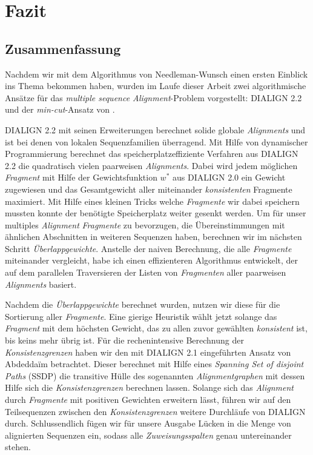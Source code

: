 \chapter{Fazit}
\label{ch:fazit}

\section{Zusammenfassung}

Nachdem wir mit dem Algorithmus von Needleman-Wunsch einen ersten Einblick ins Thema bekommen haben, wurden im Laufe dieser Arbeit zwei algorithmische Ansätze für das \emph{multiple sequence Alignment}-Problem vorgestellt: DIALIGN 2.2 und der \emph{min-cut}-Ansatz von \cite{cpm10}.

DIALIGN 2.2 mit seinen Erweiterungen berechnet solide globale \emph{Alignments} und ist bei denen von lokalen Sequenzfamilien überragend. Mit Hilfe von dynamischer Programmierung berechnet das speicherplatzeffiziente Verfahren aus DIALIGN 2.2 die quadratisch vielen paarweisen \emph{Alignments}. Dabei wird jedem möglichen \emph{Fragment} mit Hilfe der Gewichtsfunktion $w^{*}$ aus DIALIGN 2.0 ein Gewicht zugewiesen und das Gesamtgewicht aller miteinander \emph{konsistenten} Fragmente maximiert. Mit Hilfe eines kleinen Tricks welche \emph{Fragmente} wir dabei speichern mussten konnte der benötigte Speicherplatz weiter gesenkt werden. Um für unser multiples \emph{Alignment} \emph{Fragmente} zu bevorzugen, die Übereinstimmungen mit ähnlichen Abschnitten in weiteren Sequenzen haben, berechnen wir im nächsten Schritt \emph{Überlappgewichte}. Anstelle der naiven Berechnung, die alle \emph{Fragmente} miteinander vergleicht, habe ich einen effizienteren Algorithmus entwickelt, der auf dem parallelen Traversieren der Listen von \emph{Fragmenten} aller paarweisen \emph{Alignments} basiert.

Nachdem die \emph{Überlappgewichte} berechnet wurden, nutzen wir diese für die Sortierung aller \emph{Fragmente}. Eine gierige Heuristik wählt jetzt solange das \emph{Fragment} mit dem höchsten Gewicht, das zu allen zuvor gewählten \emph{konsistent} ist, bis keins mehr übrig ist. Für die rechenintensive Berechnung der \emph{Konsistenzgrenzen} haben wir den mit DIALIGN 2.1 eingeführten Ansatz von Abdedda\"im betrachtet. Dieser berechnet mit Hilfe eines \emph{Spanning Set of disjoint Paths} (SSDP) die transitive Hülle des sogenannten \emph{Alignmentgraphen} mit dessen Hilfe sich die \emph{Konsistenzgrenzen} berechnen lassen.
Solange sich das \emph{Alignment} durch \emph{Fragmente} mit positiven Gewichten erweitern lässt, führen wir auf den Teilsequenzen zwischen den \emph{Konsistenzgrenzen} weitere Durchläufe von DIALIGN durch. Schlussendlich fügen wir für unsere Ausgabe Lücken in die Menge von alignierten Sequenzen ein, sodass alle \emph{Zuweisungsspalten} genau untereinander stehen.
	
